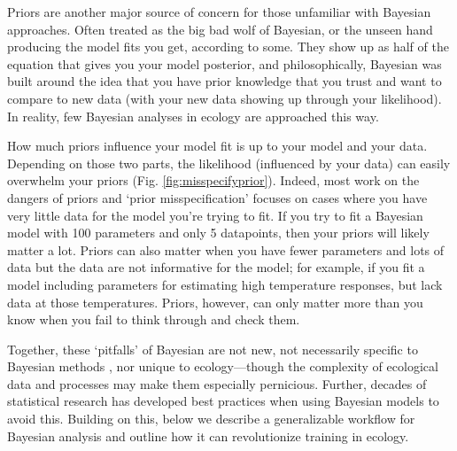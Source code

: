 \documentclass[11pt]{article}
\begin{document}
Priors are another major source of concern for those unfamiliar with Bayesian approaches. Often treated as the big bad wolf of Bayesian, or the unseen hand producing the model fits you get, according to some. They show up as half of the equation that gives you your model posterior, and philosophically, Bayesian was built around the idea that you have prior knowledge that you trust and want to compare to new data (with your new data showing up through your likelihood). In reality, few Bayesian analyses in ecology are approached this way. 

How much priors influence your model fit is up to your model and your data. Depending on those two parts, the likelihood (influenced by your data) can easily overwhelm your priors (Fig. \ref{fig:misspecifyprior}). Indeed, most work on the dangers of priors and `prior misspecification'  focuses on cases where you have very little data for the model you're trying to fit. If you try to fit a Bayesian model with 100 parameters and only 5 datapoints, then your priors will likely matter a lot. Priors can also matter when you have fewer parameters and lots of data but the data are not informative for the model; for example, if you fit a model including parameters for estimating high temperature responses, but lack data at those temperatures. Priors, however, can only matter more than you know when you fail to think through and check them. 

Together, these `pitfalls' of Bayesian are not new, not necessarily specific to Bayesian methods \citep{low2014rising}, nor unique to ecology---though the complexity of ecological data and processes may make them especially pernicious. Further, decades of statistical research has developed best practices when using Bayesian models to avoid this. Building on this, below we describe a generalizable workflow for Bayesian analysis and outline how it can revolutionize training in ecology.
\end{document}
